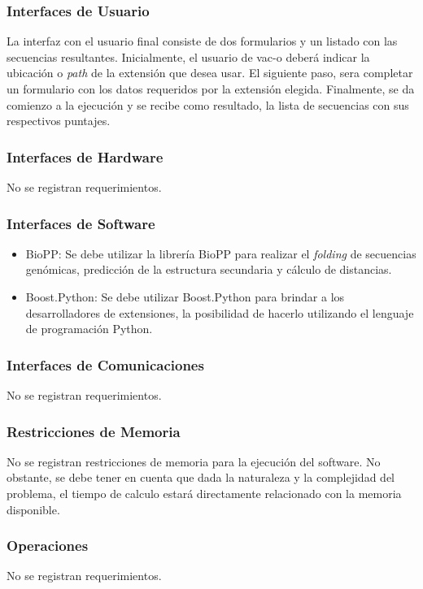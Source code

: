 \documentclass[10pt,a4paper]{article}
\begin{document}
    \subsubsection{Interfaces de Usuario}
    La interfaz con el usuario final consiste de dos formularios y un listado con las secuencias resultantes. Inicialmente, el usuario de vac-o deber\'a indicar la ubicaci\'on o \textit{path} de la extensi\'on que desea usar. El siguiente paso, sera completar un formulario con los datos requeridos por la extensi\'on elegida. Finalmente, se da comienzo a la ejecuci\'on y se recibe como resultado, la lista de secuencias con sus respectivos puntajes.

    \subsubsection{Interfaces de Hardware}
    No se registran requerimientos.

    \subsubsection{Interfaces de Software}
    \begin{itemize}
      \item BioPP: Se debe utilizar la librer\'ia BioPP para realizar el \textit{folding} de secuencias gen\'omicas, predicci\'on de la estructura secundaria y c\'alculo de distancias.
      \item Boost.Python: Se debe utilizar Boost.Python para brindar a los desarrolladores de extensiones, la posibilidad de hacerlo utilizando el lenguaje de programaci\'on Python.      
    \end{itemize}

    \subsubsection{Interfaces de Comunicaciones}
    No se registran requerimientos.

    \subsubsection{Restricciones de Memoria}
    No se registran restricciones de memoria para la ejecuci\'on del software. No obstante, se debe tener en cuenta que dada la naturaleza y la complejidad del problema, el tiempo de calculo estar\'a directamente relacionado con la memoria disponible.

    \subsubsection{Operaciones}
    No se registran requerimientos.
\end{document}

